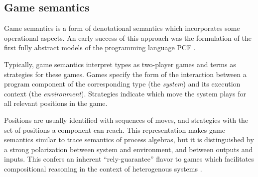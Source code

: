 \documentclass[acmsmall,authordraft]{acmart}
\begin{document}

%
%
%


\subsection{Game semantics} \label{sec:gamesem} %


Game semantics is a form of denotational semantics which
incorporates some operational aspects.
An early success of this approach was
the formulation of the first fully abstract models
of the programming language PCF \cite{pcfajm,pcfho}.

Typically,
game semantics interpret
types as two-player games
and terms as strategies for these games.
Games specify the form of the interaction
between a program component of the corresponding type
(the \emph{system})
and its execution context
(the \emph{environment}).
Strategies
indicate which move the system plays
for all relevant positions in the game.

Positions are usually identified with sequences of moves,
and strategies with the set of positions
a component can reach.
This representation makes
game semantics similar to
trace semantics of process algebras,
but it is distinguished
by a strong polarization between
system and environment,
and between outputs and inputs.
This confers an inherent ``rely-guarantee'' flavor
to games which facilitates compositional reasoning
in the context of heterogenous systems \cite{cspgs}.
\end{document}
